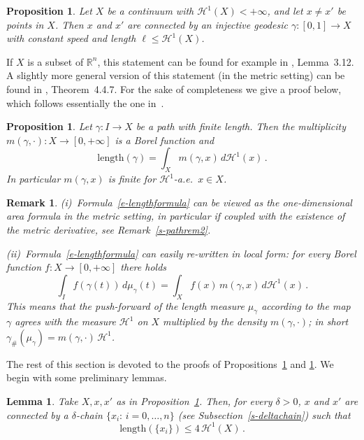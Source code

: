 \documentclass[11pt,reqno,a4paper,final]{amsart}
\numberwithin{equation}{section}
\theoremstyle{mytheorem}
\newtheorem{lemma}[subsection]{Lemma}
\newtheorem{proposition}[subsection]{Proposition}
\theoremstyle{myremark}
\newtheorem{remark}[subsection]{Remark}
\theoremstyle{myparagraph}
\newcommand{\R}{\mathbb{R}}
\newcommand{\Haus}{\mathscr{H}}
\newcommand{\Len}{\mathrm{length}}
\begin{document}
\begin{proposition}
\label{s-pathconn}
Let $X$ be a continuum with $\Haus^1(X)<+\infty$, 
and let $x \ne x'$ be points in $X$.
Then $x$ and $x'$ are connected by an injective
geodesic $\gamma:[0,1]\to X$ with constant speed 
and length $\ell\le \Haus^1(X)$.
\end{proposition}

If $X$ is a subset of $\R^n$, this statement can be found 
for example in \cite{Fa}, Lemma~3.12. 
A slightly more general version of this statement 
(in the metric setting) can be found in 
\cite{AT}, Theorem~4.4.7. 
For the sake of completeness we give a proof below, 
which follows essentially the one in~\cite{Fa}.


\begin{proposition}
\label{s-lengthformula}
Let $\gamma:I\to X$ be a path with finite length. 
Then the multiplicity $m(\gamma,\cdot):X\to[0,+\infty]$ 
is a Borel function and 
%
\begin{equation}
\label{e-lengthformula}
\Len(\gamma) = \int_X m(\gamma,x) \, d\Haus^1(x)
\, .
\end{equation}
%
In particular $m(\gamma,x)$ is finite for $\Haus^1$-a.e.~$x\in X$.
\end{proposition}


\begin{remark}
(i)~Formula~\eqref{e-lengthformula} can be viewed as the one-dimensional 
area formula in the metric setting, in particular if coupled with the 
existence of the metric derivative, see Remark~\ref{s-pathrem2}.

\smallskip
(ii)~Formula~\eqref{e-lengthformula} can easily re-written in  
local form: for every Borel function $f:X\to [0,+\infty]$ there holds
%
\begin{equation}
\label{e-lengthformula2}
\int_I f(\gamma(t)) \, d\mu_\gamma(t) 
= \int_X f(x) \, m(\gamma,x) \, d\Haus^1(x)
\, .
\end{equation}
%
This means that the push-forward of the length measure 
$\mu_\gamma$ according to the map $\gamma$ agrees with the 
measure $\Haus^1$ on $X$ multiplied by the density $m(\gamma,\cdot)$;
in short $\gamma_\#(\mu_\gamma)=m(\gamma,\cdot) \, \Haus^1$.
\end{remark}


\bigskip
The rest of this section is devoted to the proofs of  
Propositions~\ref{s-pathconn} and \ref{s-lengthformula}.
We begin with some preliminary lemmas.

\begin{lemma}
\label{s-chainconn}
Take $X, x,x'$ as in Proposition~\ref{s-pathconn}.
Then, for every $\delta>0$, $x$ and $x'$ are connected by a 
$\delta$-chain $\{x_i: \, i=0,\dots, n\}$  (see Subsection~\ref{s-deltachain}) 
such that 
%
\begin{equation}
\label{e-chainconn}
\Len(\{x_i\}) \le 4\,\Haus^1(X)
\, .
\end{equation}
\end{lemma}
\end{document}
